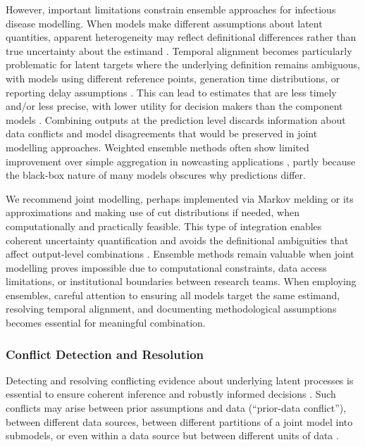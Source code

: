 \documentclass{article}
\begin{document}
However, important limitations constrain ensemble approaches for infectious disease modelling.
When models make different assumptions about latent quantities, apparent heterogeneity may reflect definitional differences rather than true uncertainty about the estimand \citep{brockhaus2023why}.
Temporal alignment becomes particularly problematic for latent targets where the underlying definition remains ambiguous, with models using different reference points, generation time distributions, or reporting delay assumptions \citep{brockhaus2023why}.
This can lead to estimates that are less timely and/or less precise, with lower utility for decision makers than the component models \citep{manley2024combining}.
Combining outputs at the prediction level discards information about data conflicts and model disagreements that would be preserved in joint modelling approaches.
Weighted ensemble methods often show limited improvement over simple aggregation in nowcasting applications \citep{sherratt2021exploring}, partly because the black-box nature of many models obscures why predictions differ.

We recommend joint modelling, perhaps implemented via Markov melding or its approximations and making use of cut distributions if needed, when computationally and practically feasible. This type of integration enables coherent uncertainty quantification and avoids the definitional ambiguities that affect output-level combinations \citep{manley2024combining, brockhaus2023why}.
Ensemble methods remain valuable when joint modelling proves impossible due to computational constraints, data access limitations, or institutional boundaries between research teams.
When employing ensembles, careful attention to ensuring all models target the same estimand, resolving temporal alignment, and documenting methodological assumptions becomes essential for meaningful combination.


\subsubsection{Conflict Detection and Resolution}

Detecting and resolving conflicting evidence about underlying latent processes is essential to ensure coherent inference and robustly informed decisions \citep{presanis2013conflict,sherratt2021exploring}. Such conflicts may arise between prior assumptions and data (``prior-data conflict''), between different data sources, between different partitions of a joint model into submodels, or even within a data source but between different units of data \citep{presanis2013conflict,yang2025detecting}.
\end{document}
